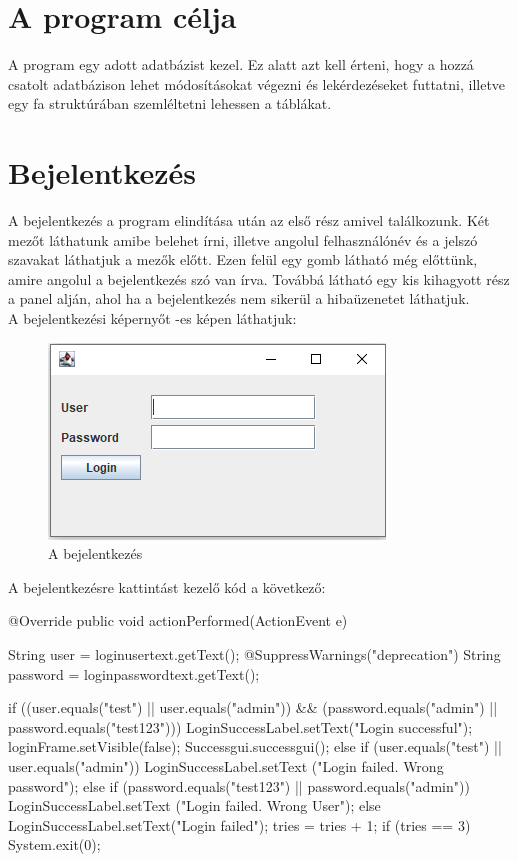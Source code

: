 \section{A program célja} A program egy adott adatbázist kezel. Ez alatt azt kell érteni, hogy a hozzá csatolt adatbázison lehet módosításokat végezni és lekérdezéseket futtatni, illetve egy fa struktúrában szemléltetni lehessen a táblákat.

\section{Bejelentkezés} A bejelentkezés a program elindítása után az első rész amivel találkozunk. Két mezőt láthatunk amibe belehet írni, illetve angolul felhasználónév és a jelszó szavakat láthatjuk a mezők előtt. Ezen felül egy gomb látható még előttünk, amire angolul a bejelentkezés szó van írva. Továbbá látható egy kis kihagyott rész a panel alján, ahol ha a bejelentkezés nem sikerül a hibaüzenetet láthatjuk.\\
A bejelentkezési képernyőt -es képen láthatjuk:
\begin{figure} [h]
	\centering
	\includegraphics[width=.5\linewidth]{images/login.png}
	\caption{A bejelentkezés}
	\label{fig:login}
\end{figure}

\newpage
A bejelentkezésre kattintást kezelő kód a következő:

\begin{java}
@Override
public void actionPerformed(ActionEvent e) {
	
	String user = loginusertext.getText();
	@SuppressWarnings("deprecation")
	String password = loginpasswordtext.getText();
		
	if ((user.equals("test") || user.equals("admin"))
		&& (password.equals("admin") ||
	 	password.equals("test123"))) {
		LoginSuccessLabel.setText("Login successful");
		loginFrame.setVisible(false);
		Successgui.successgui();		
	} else if (user.equals("test") ||
	 	user.equals("admin")) {
		LoginSuccessLabel.setText
		("Login failed. Wrong password");
	} else if (password.equals("test123") ||
		 password.equals("admin")) {
		LoginSuccessLabel.setText
		("Login failed. Wrong User");
	} else
		LoginSuccessLabel.setText("Login failed");
		tries = tries + 1;
	if (tries == 3) {
		System.exit(0);
	}	
}	
\end{java}
\newpage

